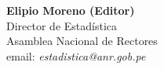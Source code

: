 \begin{center}
\textbf{Elipio Moreno (Editor)}\\
Director de Estadí­stica \\
Asamblea Nacional de Rectores \\
email: \textit{estadistica@anr.gob.pe}\\
\end{center}

